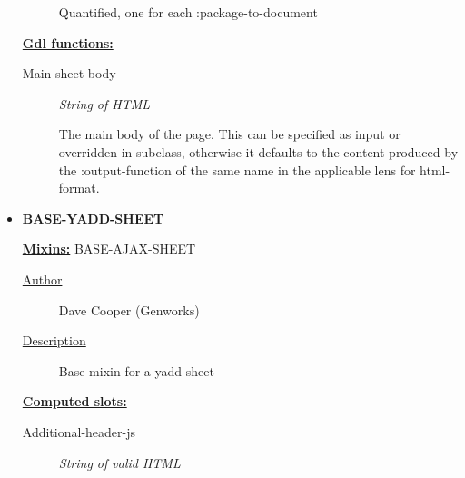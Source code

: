 \documentclass [11pt]{book}
\begin{document}
\begin{itemize}
\begin{description}
 Quantified, one for each :package-to-document




\end{description}






\textbf{
\underline{Gdl functions:}}

\begin{description}

\item [Main-sheet-body]
\emph{String of HTML}

 The main body of the page.
This can be specified as input or overridden in subclass, otherwise it defaults
to the content produced by the :output-function of the same name
in the applicable lens for  html-format.




\end{description}







\item {}
\label{prim:base-yadd-sheet}
\textbf{BASE-YADD-SHEET}


\textbf{
\underline{Mixins:}} BASE-AJAX-SHEET





\begin{description}

\item [
\underline{Author}]


Dave Cooper (Genworks)



\item [
\underline{Description}]


Base mixin for a yadd sheet



\end{description}








\textbf{
\underline{Computed slots:}}

\begin{description}

\item [Additional-header-js]
\emph{String of valid HTML}


\end{description}
\end{itemize}
\end{document}
